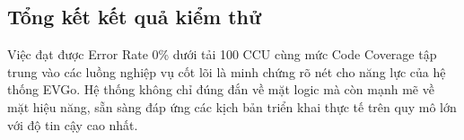 \subsection{Tổng kết kết quả kiểm thử}

\hspace*{\parindent} Việc đạt được Error Rate 0\% dưới tải 100 CCU cùng mức Code Coverage tập trung vào các luồng nghiệp vụ cốt lõi là minh chứng rõ nét cho năng lực của hệ thống EVGo. Hệ thống không chỉ đúng đắn về mặt logic mà còn mạnh mẽ về mặt hiệu năng, sẵn sàng đáp ứng các kịch bản triển khai thực tế trên quy mô lớn với độ tin cậy cao nhất.